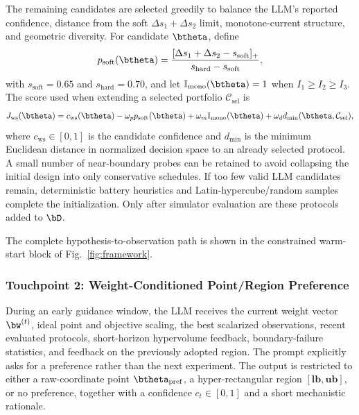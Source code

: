 The remaining candidates are selected greedily to balance the LLM's reported
confidence, distance from the soft $\Delta s_1+\Delta s_2$ limit, monotone-current
structure, and geometric diversity. For candidate $\btheta$, define
\begin{equation}
p_{\mathrm{soft}}(\btheta)=
\frac{[\Delta s_1+\Delta s_2-s_{\mathrm{soft}}]_+}
{s_{\mathrm{hard}}-s_{\mathrm{soft}}},
\label{eq:softpen}
\end{equation}
with $s_{\mathrm{soft}}=0.65$ and $s_{\mathrm{hard}}=0.70$, and let
$\mathbb{I}_{\mathrm{mono}}(\btheta)=1$ when $I_1\ge I_2\ge I_3$. The score used
when extending a selected portfolio $\mathcal C_{\mathrm{sel}}$ is
\begin{equation}
J_{\mathrm{ws}}(\btheta)=
c_{\mathrm{ws}}(\btheta)
-\omega_p p_{\mathrm{soft}}(\btheta)
+\omega_m\mathbb{I}_{\mathrm{mono}}(\btheta)
+\omega_d d_{\min}(\btheta,\mathcal C_{\mathrm{sel}}),
\label{eq:portfolio}
\end{equation}
where $c_{\mathrm{ws}}\in[0,1]$ is the candidate confidence and $d_{\min}$ is
the minimum Euclidean distance in normalized decision space to an already
selected protocol. A small number of near-boundary probes can be retained to
avoid collapsing the initial design into only conservative schedules. If too
few valid LLM candidates remain, deterministic battery heuristics and
Latin-hypercube/random samples complete the initialization. Only after simulator
evaluation are these protocols added to $\bD$.

The complete hypothesis-to-observation path is shown in the constrained
warm-start block of Fig.~\ref{fig:framework}.

\subsubsection{Touchpoint 2: Weight-Conditioned Point/Region Preference}

During an early guidance window, the LLM receives the current weight vector
$\bw^{(t)}$, ideal point and objective scaling, the best scalarized observations,
recent evaluated protocols, short-horizon hypervolume feedback, boundary-failure
statistics, and feedback on the previously adopted region. The prompt explicitly
asks for a preference rather than the next experiment. The output is restricted
to either a raw-coordinate point $\btheta_{\mathrm{pref}}$, a hyper-rectangular
region $[\mathbf{lb},\mathbf{ub}]$, or no preference, together with a confidence
$c_t\in[0,1]$ and a short mechanistic rationale.

